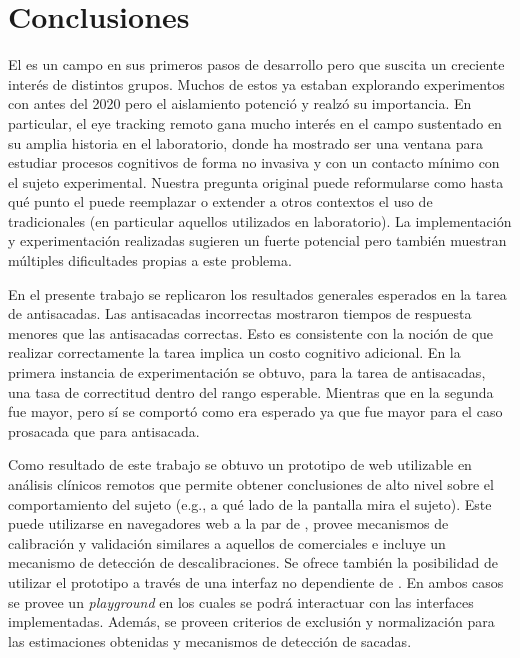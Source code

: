 \chapter{Conclusiones}

El \eyetrackingweb es un campo en sus primeros pasos de desarrollo pero que
suscita un creciente interés de distintos grupos.
Muchos de estos ya estaban explorando experimentos con \eyetrackingweb antes
del 2020 pero el aislamiento potenció y realzó su importancia.
En particular, el eye tracking remoto gana mucho interés en el campo sustentado
en su amplia historia en el laboratorio, donde ha mostrado ser una ventana para
estudiar procesos cognitivos de forma no invasiva y con un contacto mínimo con
el sujeto experimental.
Nuestra pregunta original puede reformularse como hasta qué punto el
\eyetrackingweb puede reemplazar o extender a otros contextos el uso de
\eyetrackers tradicionales (en particular aquellos utilizados en laboratorio).
La implementación y experimentación realizadas sugieren un fuerte potencial
pero también muestran múltiples dificultades propias a este problema.

En el presente trabajo se replicaron los resultados generales esperados en la
tarea de antisacadas.
Las antisacadas incorrectas mostraron tiempos de respuesta menores que las
antisacadas correctas.
Esto es consistente con la noción de que realizar correctamente la tarea
implica un costo cognitivo adicional.
En la primera instancia de experimentación se obtuvo, para la tarea de
antisacadas, una tasa de correctitud dentro del rango esperable.
Mientras que en la segunda fue mayor, pero sí se comportó como era esperado ya
que fue mayor para el caso prosacada que para antisacada.

Como resultado de este trabajo se obtuvo un prototipo de \eyetracker web
utilizable en análisis clínicos remotos que permite obtener conclusiones de
alto nivel sobre el comportamiento del sujeto (e.g., a qué lado de la pantalla
mira el sujeto).
Este puede utilizarse en navegadores web a la par de \jspsych, provee
mecanismos de calibración y validación similares a aquellos de \eyetrackers
comerciales e incluye un mecanismo de detección de descalibraciones.
Se ofrece también la posibilidad de utilizar el prototipo a través de una
interfaz no dependiente de \jspsych.
En ambos casos se provee un \textit{playground} en los cuales se podrá
interactuar con las interfaces implementadas.
Además, se proveen criterios de exclusión y normalización para las estimaciones
obtenidas y mecanismos de detección de sacadas.

